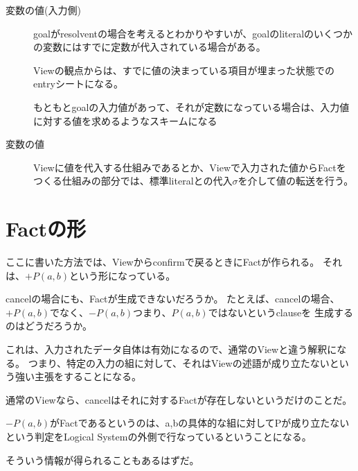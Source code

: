 \documentclass[10pt, onecolumn]{jarticle}   	%
\begin{document}
\begin{description}
\item[ 変数の値(入力側)] goalがresolventの場合を考えるとわかりやすいが、goalのliteralのいくつかの変数にはすでに定数が代入されている場合がある。

Viewの観点からは、すでに値の決まっている項目が埋まった状態でのentryシートになる。

もともとgoalの入力値があって、それが定数になっている場合は、入力値に対する値を求めるようなスキームになる

\item[変数の値] Viewに値を代入する仕組みであるとか、Viewで入力された値からFactをつくる仕組みの部分では、標準literalとの代入$\sigma$を介して値の転送を行う。

\end{description}


%



\section{Factの形}
ここに書いた方法では、Viewからconfirmで戻るときにFactが作られる。
それは、$+P(a,b)$という形になっている。

cancelの場合にも、Factが生成できないだろうか。
たとえば、cancelの場合、$+P(a,b)$でなく、$-P(a,b)$つまり、$P(a,b)$ではないというclauseを
生成するのはどうだろうか。

これは、入力されたデータ自体は有効になるので、通常のViewと違う解釈になる。
つまり、特定の入力の組に対して、それはViewの述語が成り立たないという強い主張をすることになる。

通常のViewなら、cancelはそれに対するFactが存在しないというだけのことだ。

$-P(a,b)$がFactであるというのは、a,bの具体的な組に対してPが成り立たないという判定をLogical Systemの外側で行なっているということになる。

そういう情報が得られることもあるはずだ。
\end{document}
